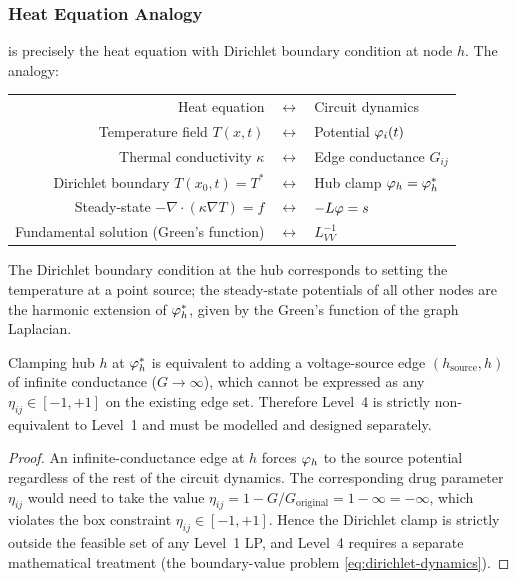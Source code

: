 \subsubsection{Heat Equation Analogy}

 is precisely the heat equation with Dirichlet
boundary condition at node $h$.  The analogy:

\begin{center}
\begin{tabular}{@{}rcl@{}}
  Heat equation & $\longleftrightarrow$ & Circuit dynamics \\
  Temperature field $T(x,t)$ & $\longleftrightarrow$ & Potential $\varphi_i(t)$ \\
  Thermal conductivity $\kappa$ & $\longleftrightarrow$ & Edge conductance $G_{ij}$ \\
  Dirichlet boundary $T(x_0, t) = T^*$ & $\longleftrightarrow$ & Hub clamp $\varphi_h = \varphi_h^*$ \\
  Steady-state $-\nabla \cdot (\kappa \nabla T) = f$ & $\longleftrightarrow$ & $-L\varphi = s$ \\
  Fundamental solution (Green's function) & $\longleftrightarrow$ & $L_{VV}^{-1}$ \\
\end{tabular}
\end{center}

The Dirichlet boundary condition at the hub corresponds to setting the
temperature at a point source; the steady-state potentials of all other
nodes are the harmonic extension of $\varphi_h^*$, given by the
Green's function of the graph Laplacian.

\begin{proposition}
\label{prop:level4}
Clamping hub $h$ at $\varphi_h^*$ is equivalent to adding a
voltage-source edge $(h_{\mathrm{source}}, h)$ of infinite conductance
($G \to \infty$), which cannot be expressed as any $\eta_{ij} \in [-1,+1]$
on the existing edge set.  Therefore Level~4 is strictly non-equivalent
to Level~1 and must be modelled and designed separately.
\end{proposition}

\begin{proof}
An infinite-conductance edge at $h$ forces $\varphi_h$ to the source
potential regardless of the rest of the circuit dynamics.  The corresponding
drug parameter $\eta_{ij}$ would need to take the value $\eta_{ij} = 1 - G/G_{\mathrm{original}} = 1 - \infty = -\infty$,
which violates the box constraint $\eta_{ij} \in [-1, +1]$.
Hence the Dirichlet clamp is strictly outside the feasible set of any
Level~1 LP, and Level~4 requires a separate mathematical treatment
(the boundary-value problem \eqref{eq:dirichlet-dynamics}).
\end{proof}

